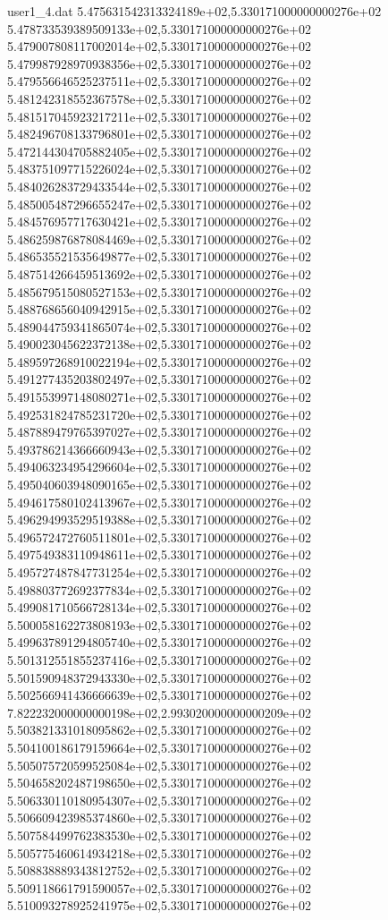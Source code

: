 \begin{filecontents}{user1_4.dat}
5.475631542313324189e+02,5.330171000000000276e+02
5.478733539389509133e+02,5.330171000000000276e+02
5.479007808117002014e+02,5.330171000000000276e+02
5.479987928970938356e+02,5.330171000000000276e+02
5.479556646525237511e+02,5.330171000000000276e+02
5.481242318552367578e+02,5.330171000000000276e+02
5.481517045923217211e+02,5.330171000000000276e+02
5.482496708133796801e+02,5.330171000000000276e+02
5.472144304705882405e+02,5.330171000000000276e+02
5.483751097715226024e+02,5.330171000000000276e+02
5.484026283729433544e+02,5.330171000000000276e+02
5.485005487296655247e+02,5.330171000000000276e+02
5.484576957717630421e+02,5.330171000000000276e+02
5.486259876878084469e+02,5.330171000000000276e+02
5.486535521535649877e+02,5.330171000000000276e+02
5.487514266459513692e+02,5.330171000000000276e+02
5.485679515080527153e+02,5.330171000000000276e+02
5.488768656040942915e+02,5.330171000000000276e+02
5.489044759341865074e+02,5.330171000000000276e+02
5.490023045622372138e+02,5.330171000000000276e+02
5.489597268910022194e+02,5.330171000000000276e+02
5.491277435203802497e+02,5.330171000000000276e+02
5.491553997148080271e+02,5.330171000000000276e+02
5.492531824785231720e+02,5.330171000000000276e+02
5.487889479765397027e+02,5.330171000000000276e+02
5.493786214366660943e+02,5.330171000000000276e+02
5.494063234954296604e+02,5.330171000000000276e+02
5.495040603948090165e+02,5.330171000000000276e+02
5.494617580102413967e+02,5.330171000000000276e+02
5.496294993529519388e+02,5.330171000000000276e+02
5.496572472760511801e+02,5.330171000000000276e+02
5.497549383110948611e+02,5.330171000000000276e+02
5.495727487847731254e+02,5.330171000000000276e+02
5.498803772692377834e+02,5.330171000000000276e+02
5.499081710566728134e+02,5.330171000000000276e+02
5.500058162273808193e+02,5.330171000000000276e+02
5.499637891294805740e+02,5.330171000000000276e+02
5.501312551855237416e+02,5.330171000000000276e+02
5.501590948372943330e+02,5.330171000000000276e+02
5.502566941436666639e+02,5.330171000000000276e+02
7.822232000000000198e+02,2.993020000000000209e+02
5.503821331018095862e+02,5.330171000000000276e+02
5.504100186179159664e+02,5.330171000000000276e+02
5.505075720599525084e+02,5.330171000000000276e+02
5.504658202487198650e+02,5.330171000000000276e+02
5.506330110180954307e+02,5.330171000000000276e+02
5.506609423985374860e+02,5.330171000000000276e+02
5.507584499762383530e+02,5.330171000000000276e+02
5.505775460614934218e+02,5.330171000000000276e+02
5.508838889343812752e+02,5.330171000000000276e+02
5.509118661791590057e+02,5.330171000000000276e+02
5.510093278925241975e+02,5.330171000000000276e+02

\end{filecontents}
